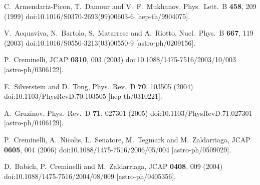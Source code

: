 \documentclass[a4paper,11pt]{article}
\begin{document}
\begin{thebibliography}{99}
  C.~Armendariz-Picon, T.~Damour and V.~F.~Mukhanov,
  Phys.\ Lett.\ B {\bf 458}, 209 (1999)
  doi:10.1016/S0370-2693(99)00603-6
  [hep-th/9904075].


  V.~Acquaviva, N.~Bartolo, S.~Matarrese and A.~Riotto,
  Nucl.\ Phys.\ B {\bf 667}, 119 (2003)
  doi:10.1016/S0550-3213(03)00550-9
  [astro-ph/0209156].


  P.~Creminelli,
  JCAP {\bf 0310}, 003 (2003)
  doi:10.1088/1475-7516/2003/10/003
  [astro-ph/0306122].


  E.~Silverstein and D.~Tong,
  Phys.\ Rev.\ D {\bf 70}, 103505 (2004)
  doi:10.1103/PhysRevD.70.103505
  [hep-th/0310221].


  A.~Gruzinov,
  Phys.\ Rev.\ D {\bf 71}, 027301 (2005)
  doi:10.1103/PhysRevD.71.027301
  [astro-ph/0406129].


  P.~Creminelli, A.~Nicolis, L.~Senatore, M.~Tegmark and M.~Zaldarriaga,
  JCAP {\bf 0605}, 004 (2006)
  doi:10.1088/1475-7516/2006/05/004
  [astro-ph/0509029].


  D.~Babich, P.~Creminelli and M.~Zaldarriaga,
  JCAP {\bf 0408}, 009 (2004)
  doi:10.1088/1475-7516/2004/08/009
  [astro-ph/0405356].


\end{thebibliography}
\end{document}
